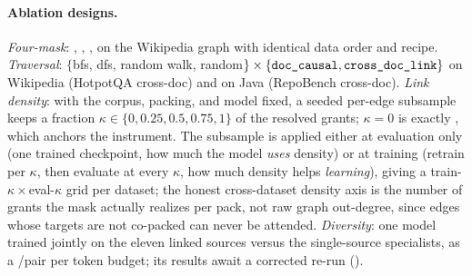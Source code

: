 \paragraph{Ablation designs.}
\emph{Four-mask}: \doccausal, \crossdoc, \concatlink, \concat on the Wikipedia graph
with identical data order and recipe. \emph{Traversal}: $\{$bfs, dfs, random walk,
random$\}\times\{\texttt{doc\_causal},\texttt{cross\_doc\_link}\}$ on Wikipedia (HotpotQA cross-doc) and on Java
(RepoBench cross-doc). \emph{Link density}: with the corpus, packing, and model fixed,
a seeded per-edge subsample keeps a fraction $\kappa\in\{0,0.25,0.5,0.75,1\}$ of the
resolved grants; $\kappa=0$ is exactly \doccausal, which anchors the instrument. The
subsample is applied either at evaluation only (one trained \crossdoc checkpoint, how
much the model \emph{uses} density) or at training (retrain per $\kappa$, then
evaluate at every $\kappa$, how much density helps \emph{learning}), giving a
train-$\kappa\times$eval-$\kappa$ grid per dataset; the honest cross-dataset density
axis is the number of grants the mask actually realizes per pack, not raw graph
out-degree, since edges whose targets are not co-packed can never be attended.
\emph{Diversity}: one model trained jointly on the eleven linked sources versus the
single-source specialists, as a \crossdoc/\doccausal pair per token budget; its
results await a corrected re-run ().
